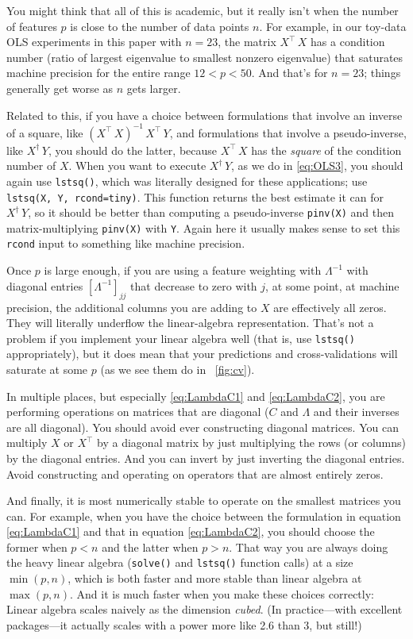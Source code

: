 \documentclass[12pt,letterpaper]{article}
\newcommand{\code}[1]{\texttt{#1}}
\begin{document}
You might think that all of this is academic, but it really isn't when the number of features $p$ is close to the number of data points $n$.
For example, in our toy-data OLS experiments in this paper with $n=23$, the matrix $X^\top\,X$ has a condition number (ratio of largest eigenvalue to smallest nonzero eigenvalue) that saturates machine precision for the entire range $12 < p < 50$.
And that's for $n=23$; things generally get worse as $n$ gets larger.

Related to this, if you have a choice between formulations that involve an inverse of a square, like $(X^\top\,X)^{-1}\,X^\top\,Y$, and formulations that involve a pseudo-inverse, like $X^\dagger\,Y$, you should do the latter, because $X^\top\,X$ has the \emph{square} of the condition number of $X$.
When you want to execute $X^\dagger\,Y$, as we do in \eqref{eq:OLS3}, you should again use \code{lstsq()}, which was literally designed for these applications; use \code{lstsq(X, Y, rcond=tiny)}.
This function returns the best estimate it can for $X^\dagger\,Y$, so
it should be better than computing a pseudo-inverse \code{pinv(X)} and then matrix-multiplying \code{pinv(X)} with \code{Y}.
Again here it usually makes sense to set this \code{rcond} input to something like machine precision.

Once $p$ is large enough, if you are using a feature weighting with $\Lambda^{-1}$ with diagonal entries $[\Lambda^{-1}]_{jj}$ that decrease to zero with $j$, at some point, at machine precision, the additional columns you are adding to $X$ are effectively all zeros.
They will literally underflow the linear-algebra representation.
That's not a problem if you implement your linear algebra well (that is, use \code{lstsq()} appropriately), but it does mean that your predictions and cross-validations will saturate at some $p$ (as we see them do in \figurename~\ref{fig:cv}).

In multiple places, but especially \eqref{eq:LambdaC1} and \eqref{eq:LambdaC2}, you are performing operations on matrices that are diagonal ($C$ and $\Lambda$ and their inverses are all diagonal).
You should avoid ever constructing diagonal matrices.
You can multiply $X$ or $X^\top$ by a diagonal matrix by just multiplying the rows (or columns) by the diagonal entries.
And you can invert by just inverting the diagonal entries.
Avoid constructing and operating on operators that are almost entirely zeros.

And finally, it is most numerically stable to operate on the smallest matrices you can.
For example, when you have the choice between the formulation in equation \eqref{eq:LambdaC1} and that in equation \eqref{eq:LambdaC2}, you should choose the former when $p<n$ and the latter when $p>n$.
That way you are always doing the heavy linear algebra (\code{solve()} and \code{lstsq()} function calls) at a size $\min(p, n)$, which is both faster and more stable than linear algebra at $\max(p, n)$. And it is much faster when you make these choices correctly:
Linear algebra scales naively as the dimension \emph{cubed}.
(In practice---with excellent packages---it actually scales with a power more like 2.6 than 3, but still!)
\end{document}
